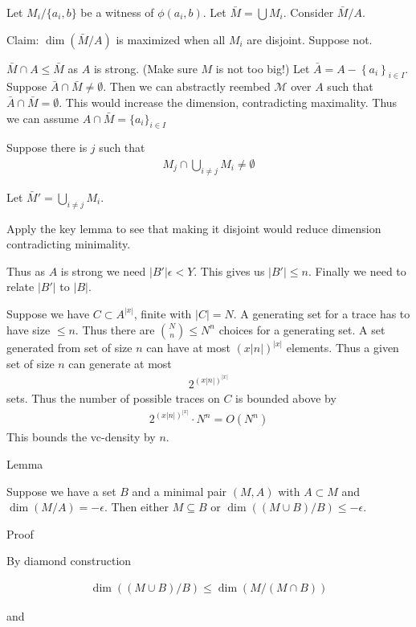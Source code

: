 \documentclass{amsart}
\newcommand{\M}{\mathcal M}
\newcommand{\curly}[1]{\left\{#1\right\}}
\begin{document}
Let $M_i / \{a_i, b\}$ be a witness of $\phi(a_i, b)$.
Let $\bar M = \bigcup M_i$.
Consider $\bar M / A$.

Claim: $\dim(\bar M / A)$ is maximized when all $M_i$ are disjoint.
Suppose not.

$\bar M \cap A \leq \bar M$ as $A$ is strong. (Make sure $M$ is not too big!)
Let $\bar A = A - \curly{a_i}_{i \in I}$.
Suppose $\bar A \cap \bar M \neq \emptyset$.
Then we can abstractly reembed $\M$ over $A$ such that $\bar A \cap \bar M = \emptyset$.
This would increase the dimension, contradicting maximality.
Thus we can assume $A \cap \bar M = \{a_i\}_{i \in I}$

Suppose there is $j$ such that
\begin{align*}
	M_j \cap \bigcup_{i \neq j} M_i \neq \emptyset
\end{align*}

Let $\bar M' = \bigcup_{i \neq j} M_i$.

Apply the key lemma to see that making it disjoint would reduce dimension contradicting minimality.

Thus as $A$ is strong we need $|B'| \epsilon < Y$.
This gives us $|B'| \leq n$.
Finally we need to relate $|B'|$ to $|B|$.

Suppose we have $C \subset A^{|x|}$, finite with $|C| = N$.
A generating set for a trace has to have size $\leq n$.
Thus there are ${N \choose n} \leq N^n$ choices for a generating set.
A set generated from set of size $n$ can have at most $(x|n|)^{|x|}$ elements.
Thus a given set of size $n$ can generate at most
\begin{align*}
	2^{(x|n|)^{|x|}}
\end{align*}
sets.
Thus the number of possible traces on $C$ is bounded above by
\begin{align*}
  2^{(x|n|)^{|x|}} \cdot N^n = O(N^n)
\end{align*}
This bounds the vc-density by $n$.

Lemma

Suppose we have a set $B$ and a minimal pair $(M, A)$ with $A \subset M$ and $\dim(M/A) = -\epsilon$.
Then either $M \subseteq B$ or $\dim((M \cup B)/B) \leq -\epsilon$.

Proof

By diamond construction

\begin{align*}
	\dim((M \cup B)/B) \leq \dim(M / (M \cap B))
\end{align*}

and 
\end{document}
